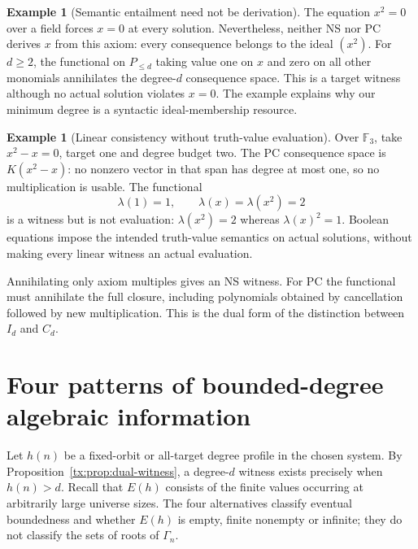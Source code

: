 \documentclass[11pt,a4paper,oneside,openany]{book}
\theoremstyle{definition}\newtheorem{definition}[theorem]{Definition}
\newtheorem{example}[theorem]{Example}
\theoremstyle{remark}\newtheorem{remark}[theorem]{Remark}
\numberwithin{equation}{chapter}
\begin{document}
\begin{example}[Semantic entailment need not be derivation]
The equation $x^2=0$ over a field forces $x=0$ at every solution.
Nevertheless, neither NS nor PC derives $x$ from this axiom: every
consequence belongs to the ideal $(x^2)$. For $d\ge2$, the functional
on $P_{\le d}$ taking value one on $x$ and zero on all other monomials
annihilates the degree-$d$ consequence space. This is a target witness
although no actual solution violates $x=0$. The example explains why
our minimum degree is a syntactic ideal-membership resource.
\end{example}

\begin{example}[Linear consistency without truth-value evaluation]
Over $\mathbb F_3$, take $x^2-x=0$, target one and degree budget two.
The PC consequence space is $K(x^2-x)$: no nonzero vector in that span
has degree at most one, so no multiplication is usable. The functional
\[
 \lambda(1)=1,\qquad\lambda(x)=\lambda(x^2)=2
\]
is a witness but is not evaluation: $\lambda(x^2)=2$ whereas
$\lambda(x)^2=1$. Boolean equations impose the intended truth-value
semantics on actual solutions, without making every linear witness an
actual evaluation.
\end{example}

Annihilating only axiom multiples gives an NS witness. For PC the
functional must annihilate the full closure, including polynomials
obtained by cancellation followed by new multiplication. This is the
dual form of the distinction between $I_d$ and $C_d$.

\section{Four patterns of bounded-degree algebraic information}
Let $h(n)$ be a fixed-orbit or all-target degree profile in the chosen
system. By Proposition~\ref{tx:prop:dual-witness}, a degree-$d$ witness
exists precisely when $h(n)>d$.
Recall that $E(h)$ consists of the finite values occurring at arbitrarily
large universe sizes. The four alternatives classify eventual boundedness and
whether $E(h)$ is empty, finite nonempty or infinite; they do not classify
the sets of roots of $\Gamma_n$.
\end{document}
